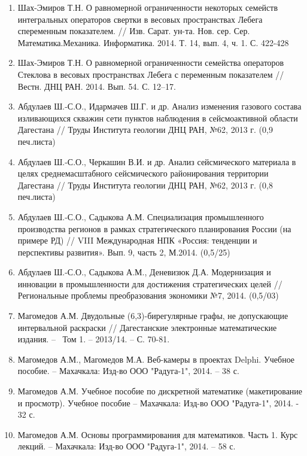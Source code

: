\begin{enumerate}
\item  Шах-Эмиров Т.Н. О равномерной ограниченности некоторых семейств интегральных операторов свертки в весовых пространствах Лебега спеременным показателем. // Изв. Сарат. ун-та. Нов. сер. Сер. Математика.Механика. Информатика. 2014. Т. 14, вып. 4, ч. 1. С. 422-428

\item  Шах-Эмиров Т.Н. О равномерной ограниченности семейства операторов Стеклова в весовых пространствах Лебега с переменным показателем // Вестн. ДНЦ РАН. 2014. Вып. 54. С. 12--17.

\item  Абдулаев Ш.-С.О., Идармачев Ш.Г. и др. Анализ изменения газового состава изливающихся скважин сети пунктов наблюдения в сейсмоактивной области Дагестана // Труды Института геологии ДНЦ РАН, №62, 2013 г. (0,9 печ.листа)

\item  Абдулаев Ш.-С.О., Черкашин В.И. и др. Анализ сейсмического материала в целях среднемасштабного сейсмического районирования территории Дагестана // Труды Института геологии ДНЦ РАН, №62, 2013 г. (0,8 печ.листа)

\item  Абдулаев Ш.-С.О., Садыкова А.М. Специализация промышленного производства регионов в рамках стратегического планирования России (на примере РД) // VIII Международная НПК «Россия: тенденции и перспективы развития». Вып. 9, часть 2, М.2014. (0,5/25)

\item  Абдулаев Ш.-С.О., Садыкова А.М., Деневизюк Д.А. Модернизация и инновации в промышленности для достижения стратегических целей // Региональные проблемы преобразования экономики №7, 2014. (0,5/03)

\item  Магомедов А.М. Двудольные (6,3)-бирегулярные графы, не допускающие интервальной раскраски // Дагестанские электронные математические издания. --  ~Том 1. -- 2013/14. -- С. 70-81.

\item  Магомедов А.М., Магомедов М.А. Веб-камеры в проектах Delphi. Учебное пособие. -- Махачкала: Изд-во ООО "Радуга-1", 2014. -- 38 с.

\item  Магомедов А.М. Учебное пособие по дискретной математике (макетирование и просмотр). Учебное пособие -- Махачкала: Изд-во ООО "Радуга-1", 2014. - 32 с.

\item  Магомедов А.М. Основы программирования для математиков. Часть 1. Курс лекций. -- Махачкала: Изд-во ООО "Радуга-1", 2014. -- 58 с.
\end{enumerate}

